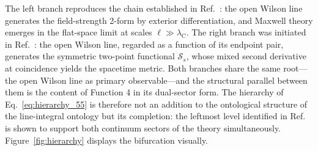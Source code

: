 \documentclass[%
 reprint, amsmath,amssymb, aps, prb, ]{revtex4-2}
\numberwithin{equation}{section}
\newcommand{\lambdaC}{\lambda_{\mathrm{C}}}
\begin{document}
The left branch reproduces the chain established in Ref.~\cite{hanamura54}: the open Wilson line generates the field-strength 2-form by exterior differentiation, and Maxwell theory emerges in the flat-space limit at scales $\ell \gg \lambdaC$. The right branch was initiated in Ref.~\cite{hanamura51}: the open Wilson line, regarded as a function of its endpoint pair, generates the symmetric two-point functional $\mathcal{S}_s$, whose mixed second derivative at coincidence yields the spacetime metric. Both branches share the same root---the open Wilson line as primary observable---and the structural parallel between them is the content of Function 4 in its dual-sector form. The hierarchy of Eq.~\eqref{eq:hierarchy_55} is therefore not an addition to the ontological structure of the line-integral ontology but its completion: the leftmost level identified in Ref.~\cite{hanamura54} is shown to support both continuum sectors of the theory simultaneously. Figure~\ref{fig:hierarchy} displays the bifurcation visually.
\end{document}
